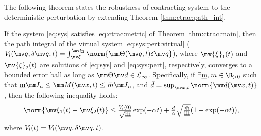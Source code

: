 The following theorem states the robustness of contracting system to the deterministic perturbation by extending Theorem \ref{thm:ctrac:path_int}.

\begin{theorem}
    If the system \eqref{eq:sys} satisfies \eqref{eq:ctrac:metric} of Theorem \ref{thm:ctrac:main}, then the path integral of the virtual system \eqref{eq:sys:pert:virtual} (\ie $V_l(\bdq,\delta\bdq,t)=\int_{\mv\xi_1}^{\mv\xi_2}\norm{\mm\Theta(\bdq,t)\delta\bdq}$), where $\mv{\xi}_1(t)$ and $\mv{\xi}_2(t)$ are solutions of \eqref{eq:sys} and \eqref{eq:sys:pert}, respectively, converges to a bounded error ball as long as $\mm\Theta\bdd\in \mathcal{L}_\infty$.
    Specifically, if $\exists \underbar m, \bar m\in\R_{>0}$ such that $\underbar m\mm I_n\le\mm M(\bdx,t)\le\bar m\mm I_n$, and $\bar d = \sup_{\bdx,t} \norm{\bdd(\bdx,t)}$, then the following inequality holds:
    \begin{equation}
        \norm{\mv\xi_1(t)-\mv\xi_2(t)}
        \le
        \tfrac{V_{l}(0)}{\sqrt{\underbar{m}}}
        \exp(-\alpha t)
        +
        \tfrac{\bar d}{\alpha}
        \sqrt{\tfrac{\bar m}{\underbar m}}
        (1-\exp(-\alpha t))
        ,
    \end{equation}
    where $V_l(t)=V_l(\bdq,\delta\bdq,t)$.
    \label{thm:ctrac:pert}
\end{theorem}

